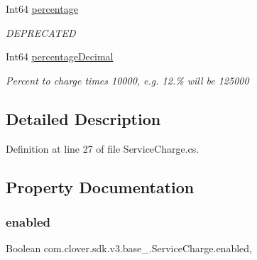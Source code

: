 \begin{DoxyCompactItemize}
Int64 \hyperlink{classcom_1_1clover_1_1sdk_1_1v3_1_1base___1_1_service_charge_a34537cf768c6164ff732eb864313d69b}{percentage}
\begin{DoxyCompactList}\small\item\em D\+E\+P\+R\+E\+C\+A\+T\+ED \end{DoxyCompactList}\item 
Int64 \hyperlink{classcom_1_1clover_1_1sdk_1_1v3_1_1base___1_1_service_charge_a7b440381554264ea36d57097642573af}{percentage\+Decimal}
\begin{DoxyCompactList}\small\item\em Percent to charge times 10000, e.\+g. 12.\% will be 125000 \end{DoxyCompactList}\end{DoxyCompactItemize}


\subsection{Detailed Description}


Definition at line 27 of file Service\+Charge.\+cs.



\subsection{Property Documentation}
\mbox{\label{classcom_1_1clover_1_1sdk_1_1v3_1_1base___1_1_service_charge_a2d02f322285cfcddbf0efca36767f951}} 
\subsubsection{\texorpdfstring{enabled}{enabled}}
{\footnotesize\ttfamily Boolean com.\+clover.\+sdk.\+v3.\+base\+\_\+.\+Service\+Charge.\+enabled\hspace{0.3cm}{\ttfamily [get]}, {\ttfamily [set]}}



